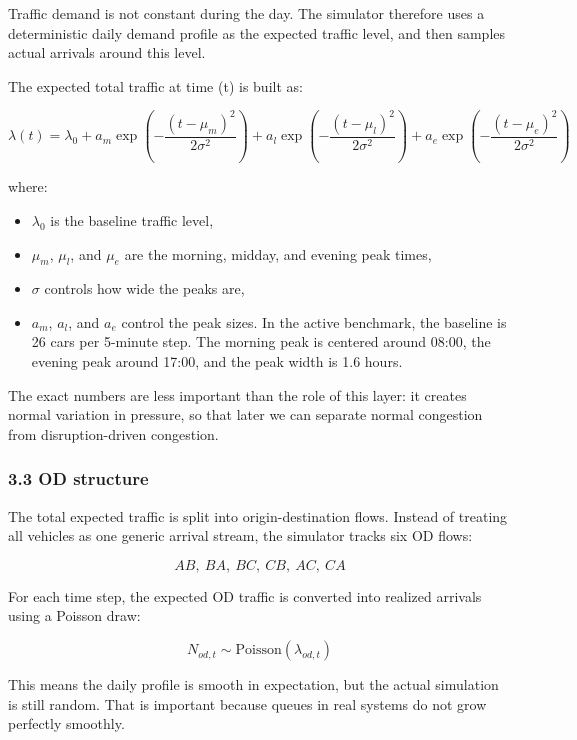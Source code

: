 \documentclass[11pt]{article}
\providecommand{\tightlist}{%
      \setlength{\itemsep}{0pt}\setlength{\parskip}{0pt}}
\begin{document}
Traffic demand is not constant during the day. The simulator therefore
uses a deterministic daily demand profile as the expected traffic level,
and then samples actual arrivals around this level.

The expected total traffic at time (t) is built as:

\[
\lambda(t)
=
\lambda_0
+
a_m \exp\left(-\frac{(t-\mu_m)^2}{2\sigma^2}\right)
+
a_l \exp\left(-\frac{(t-\mu_l)^2}{2\sigma^2}\right)
+
a_e \exp\left(-\frac{(t-\mu_e)^2}{2\sigma^2}\right)
\]

where:

\begin{itemize}
\tightlist
\item
  \(\lambda_0\) is the baseline traffic level,
\item
  \(\mu_m\), \(\mu_l\), and \(\mu_e\) are the morning, midday, and
  evening peak times,
\item
  \(\sigma\) controls how wide the peaks are,
\item
  \(a_m\), \(a_l\), and \(a_e\) control the peak sizes. In the active
  benchmark, the baseline is 26 cars per 5-minute step. The morning peak
  is centered around 08:00, the evening peak around 17:00, and the peak
  width is 1.6 hours.
\end{itemize}

The exact numbers are less important than the role of this layer: it
creates normal variation in pressure, so that later we can separate
normal congestion from disruption-driven congestion.

    \subsubsection{3.3 OD structure}\label{od-structure}

The total expected traffic is split into origin-destination flows.
Instead of treating all vehicles as one generic arrival stream, the
simulator tracks six OD flows:

\[
AB,\ BA,\ BC,\ CB,\ AC,\ CA
\]

For each time step, the expected OD traffic is converted into realized
arrivals using a Poisson draw:

\[
N_{od,t} \sim \mathrm{Poisson}(\lambda_{od,t})
\]

This means the daily profile is smooth in expectation, but the actual
simulation is still random. That is important because queues in real
systems do not grow perfectly smoothly.
\end{document}
